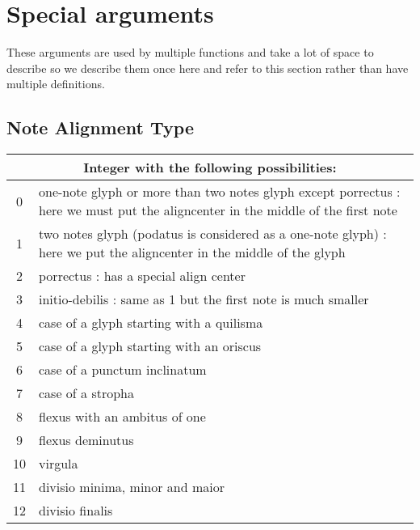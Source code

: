 \section{Special arguments}

These arguments are used by multiple functions and take a lot of space
to describe so we describe them once here and refer to this section
rather than have multiple definitions.

\subsection{Note Alignment Type}\label{notesalign}
\begin{tabular}{cp{}}
  \multicolumn{2}{c}{Integer with the following possibilities:} \\
  \hline
  0 & one-note glyph or more than two notes glyph except porrectus : here we must put the aligncenter in the middle of the first note\\
  1 & two notes glyph (podatus is considered as a one-note glyph) : here we put the aligncenter in the middle of the glyph\\
  2 & porrectus : has a special align center\\
  3 & initio-debilis : same as 1 but the first note is much smaller\\
  4 & case of a glyph starting with a quilisma\\
  5 & case of a glyph starting with an oriscus\\
  6 & case of a punctum inclinatum\\
  7 & case of a stropha\\
  8 & flexus with an ambitus of one\\
  9 & flexus deminutus\\
  10 & virgula\\
  11 & divisio minima, minor and maior\\
  12 & divisio finalis
 \end{tabular}

